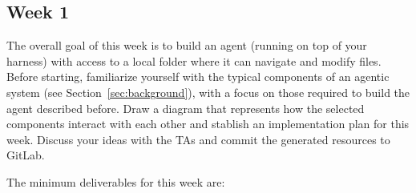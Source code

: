 \documentclass{article}
\begin{document}
\subsection{Week 1}

The overall goal of this week is to build an agent (running on top of your harness) with access to a local folder where it can navigate and modify files. Before starting, familiarize yourself with the typical components of an agentic system (see Section~\ref{sec:background}), with a focus on those required to build the agent described before. Draw a diagram that represents how the selected components interact with each other and stablish an implementation plan for this week. Discuss your ideas with the TAs and commit the generated resources to GitLab.

\vspace{5px}

\noindent The minimum deliverables for this week are:
\end{document}
